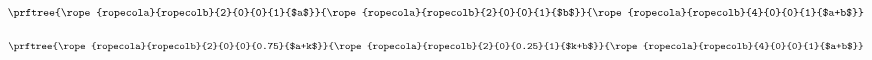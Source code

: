 \begin{equation*}
\prftree{\rope{ropecola}{ropecolb}{2}{0}{0}{1}{$a$}}
{\rope{ropecola}{ropecolb}{2}{0}{0}{1}{$b$}}
{\rope{ropecola}{ropecolb}{4}{0}{0}{1}{$a+b$}}
\end{equation*}


\begin{equation*}
\prftree{\rope{ropecola}{ropecolb}{2}{0}{0}{0.75}{$a+k$}}
{\rope{ropecola}{ropecolb}{2}{0}{0.25}{1}{$k+b$}}
{\rope{ropecola}{ropecolb}{4}{0}{0}{1}{$a+b$}}
\end{equation*}







